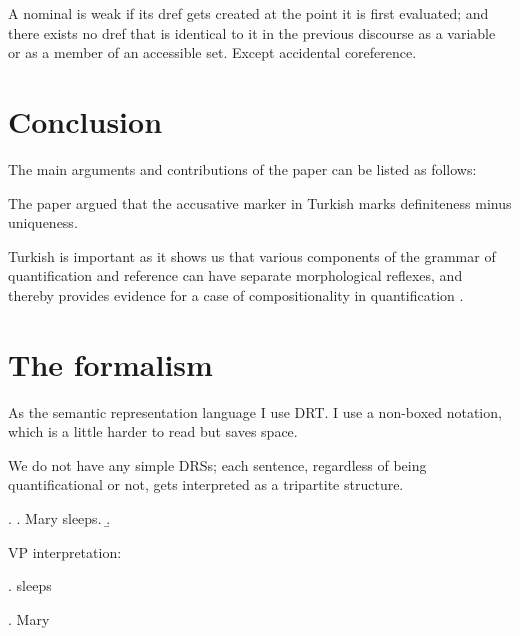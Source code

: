 \documentclass[11pt,a4paper]{article}
\begin{document}
\begin{comment}
* 51-2 inflection -- like plural in their case -- requires local accommodation, while lexical determiners are more flexible. 

* Plurarlity is an indicator of non-atomicity.

# Lopez 2012:

* syntactic structure limits the availability of modes of combination; its effect is not direct as in diesing92.

\end{comment}

\begin{udefinition}
A nominal is weak if its dref gets created at the point it is first evaluated; and there exists no dref that is identical to it in the previous discourse as a variable or as a member of an accessible set. Except accidental coreference.
\end{udefinition}


\section{Conclusion}

The main arguments and contributions of the paper can be listed as
follows:


The paper argued that the accusative marker in Turkish marks definiteness minus
uniqueness.

Turkish is important as it shows us that various components of the grammar of quantification and reference can have separate morphological reflexes, and thereby provides evidence for a case of compositionality in quantification .

\appendix

\section{The formalism}

As the semantic representation language I use DRT. I use a non-boxed notation, which is a little harder to read but saves space.  

We do not have any simple DRSs; each sentence, regardless of being quantificational or not, gets interpreted as a tripartite structure. 


\ex. 
\a. Mary sleeps.
\b. 


VP interpretation:

\ex. sleeps 

\ex. Mary   
\end{document}
